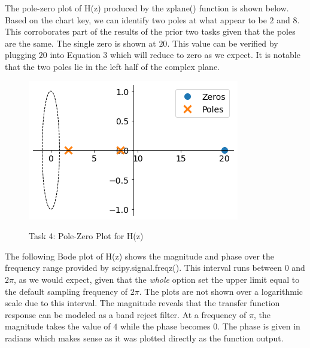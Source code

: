 \documentclass[12pt]{report}
\newcommand{\adjust}{\hspace{0.5em}}
\begin{document}
The pole-zero plot of H(z) produced by the zplane() function is shown below. Based on the chart key, we can identify two poles at what appear to be $ 2 $ and $ 8 $. This corroborates part of the results of the prior two tasks given that the poles are the same. The single zero is shown at $ 20 $. This value can be verified by plugging $ 20 $ into Equation 3 which will reduce to zero as we expect. It is notable that the two poles lie in the left half of the complex plane.

\begin{figure}[h]
	\begin{center}
		\caption*{\small \adjust Task 4: Pole-Zero Plot for H(z)}
		\vspace*{-0.43 cm}
		\includegraphics[scale = 0.8]{Lab 11 - Plots/Task4.png}\\[0.5 cm]
	\end{center}
\end{figure}

The following Bode plot of H(z) shows the magnitude and phase over the frequency range provided by scipy.signal.freqz(). This interval runs between $ 0 $ and $ 2\pi $, as we would expect, given that the \textit{whole} option set the upper limit equal to the default sampling frequency of $ 2\pi $. The plots are not shown over a logarithmic scale due to this interval. The magnitude reveals that the transfer function response can be modeled as a band reject filter. At a frequency of $ \pi $, the magnitude takes the value of $ 4 $ while the phase becomes $ 0 $. The phase is given in radians which makes sense as it was plotted directly as the function output. \\
\end{document}
